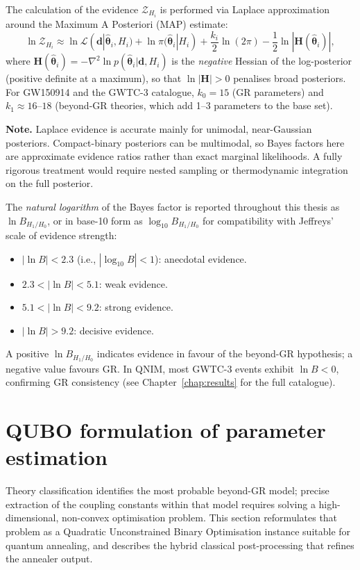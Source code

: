 \documentclass[11pt,a4paper, english]{book}
\theoremstyle{plain}
\theoremstyle{definition}
\numberwithin{equation}{chapter}
\numberwithin{figure}{chapter}
\numberwithin{table}{chapter}
\begin{document}
The calculation of the evidence $\mathcal{Z}_{H_i}$ is performed via
Laplace approximation around the Maximum A Posteriori (MAP) estimate:
\begin{equation}
  \label{eq:evidence_laplace}
  \ln\mathcal{Z}_{H_i} \approx \ln\mathcal{L}(\mathbf{d}|\hat{\boldsymbol{\theta}}_i, H_i)
    + \ln\pi(\hat{\boldsymbol{\theta}}_i|H_i)
    + \frac{k_i}{2}\ln(2\pi)
    - \frac{1}{2}\ln|\mathbf{H}(\hat{\boldsymbol{\theta}}_i)|,
\end{equation}
where $\mathbf{H}(\hat{\boldsymbol{\theta}}_i) = 
-\nabla^2\ln p(\hat{\boldsymbol{\theta}}_i|\mathbf{d},H_i)$ 
is the \emph{negative} Hessian of the log-posterior 
(positive definite at a maximum), so that 
$\ln|\mathbf{H}| > 0$ penalises broad posteriors.  For
GW150914 and the GWTC-3 catalogue, $k_0 = 15$ (GR parameters) and
$k_1 \approx 16$--$18$ (beyond-GR theories, which add 1--3 parameters
to the base set).


\noindent
\textbf{Note.} Laplace evidence is accurate mainly for unimodal, near-Gaussian posteriors. Compact-binary posteriors can be multimodal, so Bayes factors here are approximate evidence ratios rather than exact marginal likelihoods. A fully rigorous treatment would require nested sampling or thermodynamic integration on the full posterior.




The \emph{natural logarithm} of the Bayes factor is reported throughout
this thesis as $\ln B_{H_1/H_0}$, or in base-10 form as $\log_{10}B_{H_1/H_0}$
for compatibility with Jeffreys' scale of evidence strength:
\begin{itemize}
  \item $|\ln B| < 2.3$ (i.e., $|\log_{10}B| < 1$): anecdotal evidence.
  \item $2.3 < |\ln B| < 5.1$: weak evidence.
  \item $5.1 < |\ln B| < 9.2$: strong evidence.
  \item $|\ln B| > 9.2$: decisive evidence.
\end{itemize}
A positive $\ln B_{H_1/H_0}$ indicates evidence in favour of the beyond-GR
hypothesis; a negative value favours GR.  In QNIM, most GWTC-3 events exhibit
$\ln B < 0$, confirming GR consistency (see Chapter~\ref{chap:results} for
the full catalogue).

\section{QUBO formulation of parameter estimation}
\label{sec:qubo}
Theory classification identifies the most probable beyond-GR model; precise extraction of the coupling constants within that model requires solving a high-dimensional, non-convex optimisation problem. This section reformulates that problem as a Quadratic Unconstrained Binary Optimisation instance suitable for quantum annealing, and describes the hybrid classical post-processing that refines the annealer output.
\end{document}
